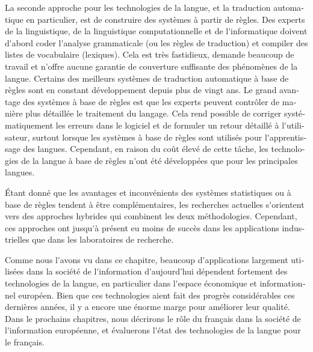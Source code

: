 \begin{french}
\begin{multicols}{2}
La seconde approche pour les technologies de la langue, et la
traduction automatique en particulier, est de construire des systèmes
à partir de règles. Des experts de la linguistique, de la linguistique
computationnelle et de l{\mbox '}informatique doivent d{\mbox '}abord
coder l{\mbox '}analyse grammaticale (ou les règles de traduction) et
compiler des listes de vocabulaire (lexiques). Cela est très
fastidieux, demande beaucoup de travail et n'offre aucune garantie de
couverture suffisante des phénomènes de la langue. Certains des
meilleurs systèmes de traduction automatique à base de règles sont en
constant développement depuis plus de vingt ans. Le grand avantage des
systèmes à base de règles est que les experts peuvent contrôler de
manière plus détaillée le traitement du langage. Cela rend possible de
corriger systématiquement les erreurs dans le logiciel et de formuler
un retour détaillé à l{\mbox '}utilisateur, surtout lorsque les
systèmes à base de règles sont utilisés pour l{\mbox '}apprentissage
des langues. Cependant, en raison du coût élevé de cette tâche, les
technologies de la langue à base de règles n{\mbox '}ont été
développées que pour les principales langues.


Étant donné que les avantages et inconvénients des systèmes
statistiques ou à base de règles tendent à être complémentaires, les
recherches actuelles s{\mbox '}orientent vers des approches hybrides qui
combinent les deux méthodologies. Cependant, ces approches ont jusqu{\mbox '}à
présent eu moins de succès dans les applications industrielles que
dans les laboratoires de recherche.

Comme nous l{\mbox '}avons vu dans ce chapitre, beaucoup d{\mbox '}applications
largement utilisées dans la société de l{\mbox '}information d{\mbox '}aujourd{\mbox '}hui
dépendent fortement des technologies de la langue, en particulier dans
l{\mbox '}espace économique et informationnel européen. Bien que ces
technologies aient fait des progrès considérables ces dernières
années, il y a encore une énorme marge pour améliorer leur
qualité. Dans le prochains chapitres, nous décrirons le rôle du
français dans la société de l{\mbox '}information européenne, et évaluerons
l{\mbox '}état des technologies de la langue pour le français.
\end{multicols}


\end{french}
